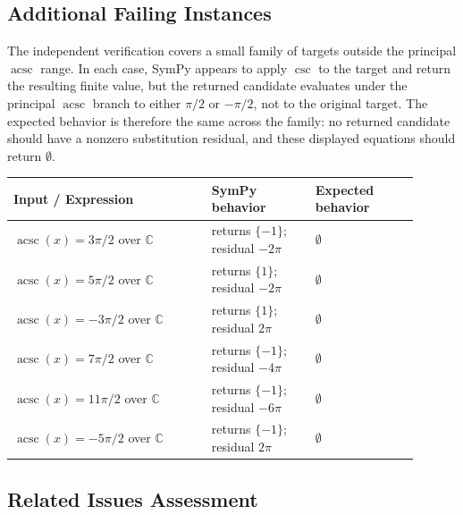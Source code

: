 \documentclass[11pt]{article}
\begin{document}
\subsection{Additional Failing Instances}

The independent verification covers a small family of targets outside the principal \(\operatorname{acsc}\) range. In each case, SymPy appears to apply \(\csc\) to the target and return the resulting finite value, but the returned candidate evaluates under the principal \(\operatorname{acsc}\) branch to either \(\pi/2\) or \(-\pi/2\), not to the original target. The expected behavior is therefore the same across the family: no returned candidate should have a nonzero substitution residual, and these displayed equations should return \(\emptyset\).

\begin{center}
\small
\renewcommand{\arraystretch}{1.3}
\begin{tabular}{@{}>{\raggedright\arraybackslash}p{0.44\linewidth}>{\raggedright\arraybackslash}p{0.23\linewidth}>{\raggedright\arraybackslash}p{0.23\linewidth}@{}}
\toprule
\textbf{Input / Expression} & \textbf{SymPy behavior} & \textbf{Expected behavior} \\
\midrule
\(\operatorname{acsc}(x)=3\pi/2\) over \(\mathbb{C}\) & returns \(\{-1\}\); residual \(-2\pi\) & \(\emptyset\) \\
\(\operatorname{acsc}(x)=5\pi/2\) over \(\mathbb{C}\) & returns \(\{1\}\); residual \(-2\pi\) & \(\emptyset\) \\
\(\operatorname{acsc}(x)=-3\pi/2\) over \(\mathbb{C}\) & returns \(\{1\}\); residual \(2\pi\) & \(\emptyset\) \\
\(\operatorname{acsc}(x)=7\pi/2\) over \(\mathbb{C}\) & returns \(\{-1\}\); residual \(-4\pi\) & \(\emptyset\) \\
\(\operatorname{acsc}(x)=11\pi/2\) over \(\mathbb{C}\) & returns \(\{-1\}\); residual \(-6\pi\) & \(\emptyset\) \\
\(\operatorname{acsc}(x)=-5\pi/2\) over \(\mathbb{C}\) & returns \(\{-1\}\); residual \(2\pi\) & \(\emptyset\) \\
\bottomrule
\end{tabular}
\end{center}

\subsection{Related Issues Assessment}
\end{document}
